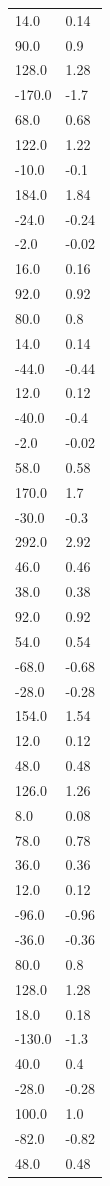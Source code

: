 \begin{longtable}{ll}
14.0 & 0.14 \\
90.0 & 0.9 \\
128.0 & 1.28 \\
-170.0 & -1.7 \\
68.0 & 0.68 \\
122.0 & 1.22 \\
-10.0 & -0.1 \\
184.0 & 1.84 \\
-24.0 & -0.24 \\
-2.0 & -0.02 \\
16.0 & 0.16 \\
92.0 & 0.92 \\
80.0 & 0.8 \\
14.0 & 0.14 \\
-44.0 & -0.44 \\
12.0 & 0.12 \\
-40.0 & -0.4 \\
-2.0 & -0.02 \\
58.0 & 0.58 \\
170.0 & 1.7 \\
-30.0 & -0.3 \\
292.0 & 2.92 \\
46.0 & 0.46 \\
38.0 & 0.38 \\
92.0 & 0.92 \\
54.0 & 0.54 \\
-68.0 & -0.68 \\
-28.0 & -0.28 \\
154.0 & 1.54 \\
12.0 & 0.12 \\
48.0 & 0.48 \\
126.0 & 1.26 \\
8.0 & 0.08 \\
78.0 & 0.78 \\
36.0 & 0.36 \\
12.0 & 0.12 \\
-96.0 & -0.96 \\
-36.0 & -0.36 \\
80.0 & 0.8 \\
128.0 & 1.28 \\
18.0 & 0.18 \\
-130.0 & -1.3 \\
40.0 & 0.4 \\
-28.0 & -0.28 \\
100.0 & 1.0 \\
-82.0 & -0.82 \\
48.0 & 0.48 \\

\end{longtable}
